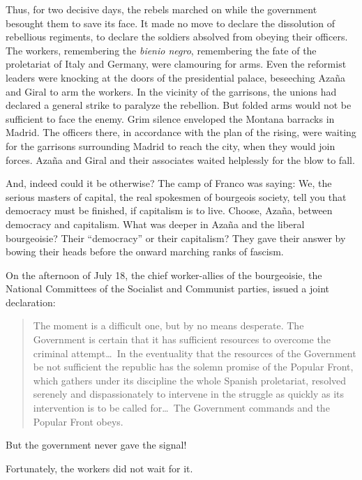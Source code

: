 Thus, for two decisive days, the rebels marched on while the government besought them to save its face. It made no move to declare the dissolution of rebellious regiments, to declare the soldiers absolved from obeying their officers. The workers, remembering the \emph{bienio negro}, remembering the fate of the proletariat of Italy and Germany, were clamouring for arms. Even the reformist leaders were knocking at the doors of the presidential palace, beseeching Azaña and Giral to arm the workers. In the vicinity of the garrisons, the unions had declared a general strike to paralyze the rebellion. But folded arms would not be sufficient to face the enemy. Grim silence enveloped the Montana barracks in Madrid. The officers there, in accordance with the plan of the rising, were waiting for the garrisons surrounding Madrid to reach the city, when they would join forces. Azaña and Giral and their associates waited helplessly for the blow to fall.

And, indeed could it be otherwise? The camp of Franco was saying: We, the serious masters of capital, the real spokesmen of bourgeois society, tell you that democracy must be finished, if capitalism is to live. Choose, Azaña, between democracy and capitalism. What was deeper in Azaña and the liberal bourgeoisie? Their ``democracy'' or their capitalism? They gave their answer by bowing their heads before the onward marching ranks of fascism.

On the afternoon of July 18, the chief worker-allies of the bourgeoisie, the National Committees of the Socialist and Communist parties, issued a joint declaration:

\begin{quotation}
  The moment is a difficult one, but by no means desperate. The Government is certain that it has sufficient resources to overcome the criminal attempt\ldots\ In the eventuality that the resources of the Government be not sufficient the republic has the solemn promise of the Popular Front, which gathers under its discipline the whole Spanish proletariat, resolved serenely and dispassionately to intervene in the struggle as quickly as its intervention is to be called for\ldots\ The Government commands and the Popular Front obeys.
\end{quotation}

But the government never gave the signal!

Fortunately, the workers did not wait for it.